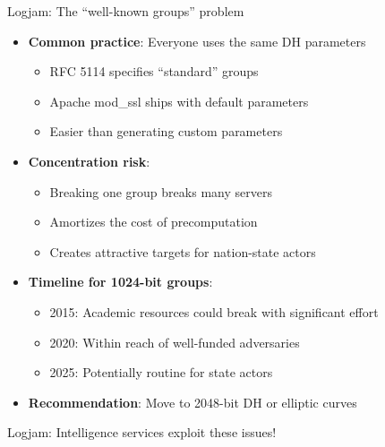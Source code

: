 \documentclass[aspectratio=169, lualatex, handout]{beamer}
\begin{document}
\begin{frame}{Logjam: The ``well-known groups'' problem}
	\begin{itemize}
		\item \textbf{Common practice}: Everyone uses the same DH parameters
		      \begin{itemize}
			      \item RFC 5114 specifies ``standard'' groups
			      \item Apache mod\_ssl ships with default parameters
			      \item Easier than generating custom parameters
		      \end{itemize}
		\item \textbf{Concentration risk}:
		      \begin{itemize}
			      \item Breaking one group breaks many servers
			      \item Amortizes the cost of precomputation
			      \item Creates attractive targets for nation-state actors
		      \end{itemize}
		\item \textbf{Timeline for 1024-bit groups}:
		      \begin{itemize}
			      \item 2015: Academic resources could break with significant effort
			      \item 2020: Within reach of well-funded adversaries
			      \item 2025: Potentially routine for state actors
		      \end{itemize}
		\item \textbf{Recommendation}: Move to 2048-bit DH or elliptic curves
	\end{itemize}
\end{frame}

\begin{frame}{Logjam: Intelligence services exploit these issues!}
\end{frame}
\end{document}
